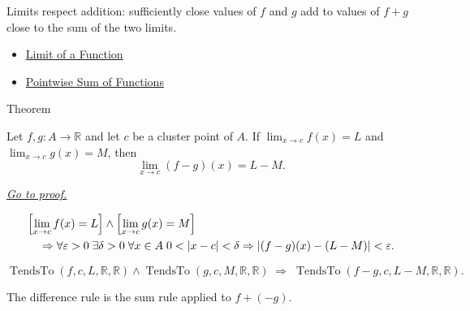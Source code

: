 \begin{remark*}[Interpretation]
Limits respect addition: sufficiently close values of $f$ and $g$ add to
values of $f+g$ close to the sum of the two limits.
\end{remark*}

\begin{dependencies}
\begin{itemize}
  \item \hyperref[def:limit-function]{Limit of a Function}
  \item \hyperref[def:pointwise-sum-of-functions]{Pointwise Sum of Functions}
\end{itemize}
\end{dependencies}


\begin{theorembox}{Theorem}
\begin{theorem}
\label{thm:limit-difference}
Let $f,g:A\to\mathbb{R}$ and let $c$ be a cluster point of $A$. If
$\lim_{x\to c}f(x)=L$ and $\lim_{x\to c}g(x)=M$, then
\[
  \lim_{x\to c}(f-g)(x)=L-M.
\]

\smallskip\noindent
\hyperref[prf:limit-difference]{\textit{Go to proof.}}
\end{theorem}
\end{theorembox}

\begin{remark*}
\[
\begin{aligned}
&\Bigl[\lim_{x\to c}f(x)=L\Bigr]\wedge\Bigl[\lim_{x\to c}g(x)=M\Bigr] \\
&\quad\Rightarrow
\forall\varepsilon>0\;\exists\delta>0\;\forall x\in A\;
0<|x-c|<\delta\Rightarrow |(f-g)(x)-(L-M)|<\varepsilon.
\end{aligned}
\]
\end{remark*}

\begin{remark*}
\[
  \operatorname{TendsTo}(f,c,L,\mathbb{R},\mathbb{R})\wedge\operatorname{TendsTo}(g,c,M,\mathbb{R},\mathbb{R})
  \;\Longrightarrow\;
  \operatorname{TendsTo}(f-g,c,L-M,\mathbb{R},\mathbb{R}).
\]
\end{remark*}

\begin{remark*}[Interpretation]
The difference rule is the sum rule applied to $f+(-g)$.
\end{remark*}


